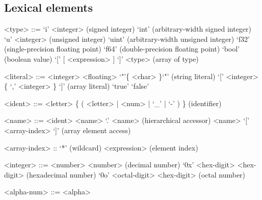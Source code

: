 \subsection{Lexical elements}
\begin{grammar}

  <type> ::= `i' <integer> (signed integer)
  \alt `int' (arbitrary-width signed integer)
  \alt `u' <integer> (unsigned integer)
  \alt `uint' (arbitrary-width unsigned integer)
  \alt `f32' (single-precision floating point)
  \alt `f64' (double-precision floating point)
  \alt `bool' (boolean value)
  \alt `[' [ <expression> ] `]' <type> (array of type)


  <literal> ::= <integer>
  \alt <floating>
  \alt `"'\{ <char> \}`"' (string literal)
  \alt `[' <integer> \{ `,' <integer> \} `]' (array literal)  
  \alt `true'
  \alt `false'

  <ident> ::= <letter> \{ ( <letter> | <num> | `_' | `-' ) \} (identifier)

  <name> ::= <ident>
  \alt <name> `.' <name> (hierarchical accessor)
  \alt <name> `[' <array-index> `]' (array element access)

  <array-index> :: `*' (wildcard)
  \alt <expression> (element index)

  <integer> ::= <number> { <number> } (decimal number)
  \alt `0x' <hex-digit> { <hex-digit> } (hexadecimal number)
  \alt `0o' <octal-digit> { <hex-digit> } (octal number)

  <alpha-num> ::= <alpha>
  
\end{grammar}

